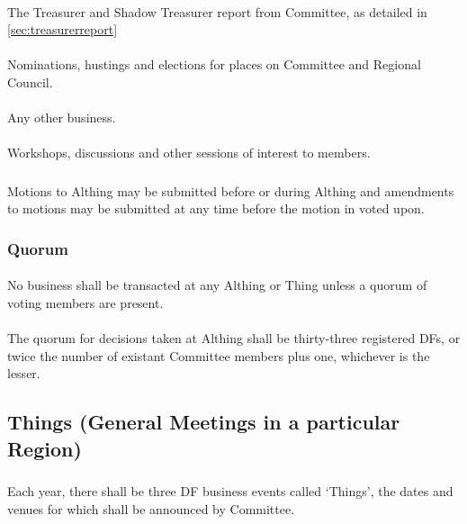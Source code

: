 \documentclass[a4paper, 12pt]{report}
\begin{document}
\paragraph{}
The Treasurer and Shadow Treasurer report from Committee, as detailed in \ref{sec:treasurerreport}
\paragraph{}
Nominations, hustings and elections for places on Committee and Regional Council.
\paragraph{}
Any other business.
\paragraph{}
Workshops, discussions and other sessions of interest to members.
\subsubsection{}
Motions to Althing may be submitted before or during Althing and amendments to motions may be submitted at any time before the motion in voted upon.
\subsubsection{Quorum}
\paragraph{} No business shall be transacted at any Althing or Thing unless a quorum of voting
members are present.
\paragraph{} The quorum for decisions taken at Althing shall be thirty-three registered DFs, or twice the number of existant Committee members plus one, whichever is the lesser.

\subsection{Things (General Meetings in a particular Region)}
\subsubsection{}
Each year, there shall be three DF business events called `Things', the dates and venues for which shall be announced by Committee.
\end{document}
